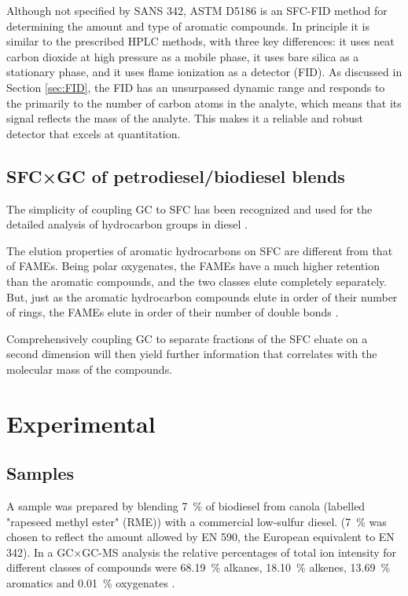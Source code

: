 Although not specified by SANS 342, ASTM D5186 \autocite{ASTMD5186} is an
SFC-FID method for determining the amount and type of aromatic compounds. In
principle it is similar to the prescribed HPLC methods, with three key
differences: it uses neat carbon dioxide at high pressure as a mobile phase, it
uses bare silica as a stationary phase, and it uses flame ionization as a
detector (FID). As discussed in Section \ref{sec:FID}, the FID has an
unsurpassed dynamic range and responds to the primarily to the number of carbon
atoms in the analyte, which means that its signal reflects the mass of the
analyte. This makes it a reliable and robust detector that excels at
quantitation.

\subsection{SFC×GC of petrodiesel/biodiesel blends}

The simplicity of coupling GC to SFC has been recognized and used for the
detailed analysis of hydrocarbon groups in diesel \autocite{Pal1998}.

The elution properties of aromatic hydrocarbons on SFC are different from that
of FAMEs. Being polar oxygenates, the FAMEs have a much higher retention than
the aromatic compounds, and the two classes elute completely separately. But,
just as the aromatic hydrocarbon compounds elute in order of their number of
rings, the FAMEs elute in order of their number of double bonds
\autocite{Smith2001}.

Comprehensively coupling GC to separate fractions of the SFC eluate on a second
dimension will then yield further information that correlates with the molecular
mass of the compounds.


\section{Experimental}

\subsection{Samples} 

A sample was prepared by blending \SI{7}{\percent} of biodiesel from canola
(labelled "rapeseed methyl ester" (RME)) with a commercial low-sulfur diesel.
(\SI{7}{\percent} was chosen to reflect the amount allowed by EN 590, the
European equivalent to EN 342). In a GC×GC-MS analysis the relative percentages
of total ion intensity for different classes of compounds were
\SI{68.19}{\percent} alkanes, \SI{18.10}{\percent} alkenes, \SI{13.69}{\percent}
aromatics and \SI{0.01}{\percent} oxygenates \autocite{Smit2015}.

